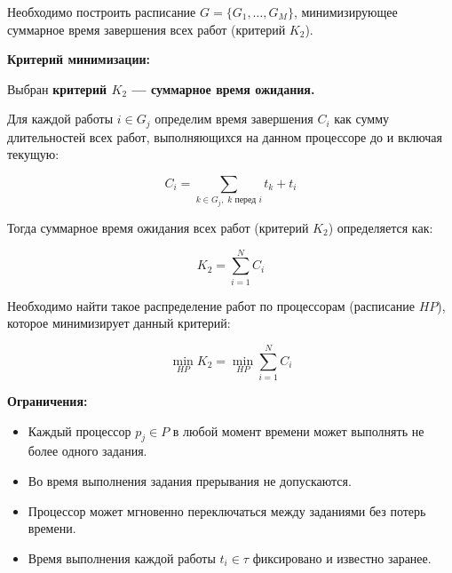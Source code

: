 Необходимо построить расписание \(G = \{G_1,\ldots,G_M\}\), минимизирующее
суммарное время завершения всех работ (критерий \(K_2\)).


\textbf{Критерий минимизации:}

Выбран \textbf{критерий $K_2$ — суммарное время ожидания.}
  
Для каждой работы $i \in G_j$ определим время завершения $C_i$ как сумму длительностей всех работ,
выполняющихся на данном процессоре до и включая текущую:

\[
C_i = \sum_{k \in G_j, \; k \text{ перед } i} t_k + t_i
\]

Тогда суммарное время ожидания всех работ (критерий $K_2$) определяется как:

\[
K_2 = \sum_{i=1}^{N} C_i
\]

Необходимо найти такое распределение работ по процессорам (расписание $HP$),
которое минимизирует данный критерий:

\[
\min_{HP} K_2 = \min_{HP} \sum_{i=1}^{N} C_i
\]

\textbf{Ограничения:}

\begin{itemize}
  \item Каждый процессор $p_j \in P$ в любой момент времени может выполнять не более одного задания.
  \item Во время выполнения задания прерывания не допускаются.
  \item Процессор может мгновенно переключаться между заданиями без потерь времени.
  \item Время выполнения каждой работы $t_i \in \tau$ фиксировано и известно заранее.
\end{itemize}